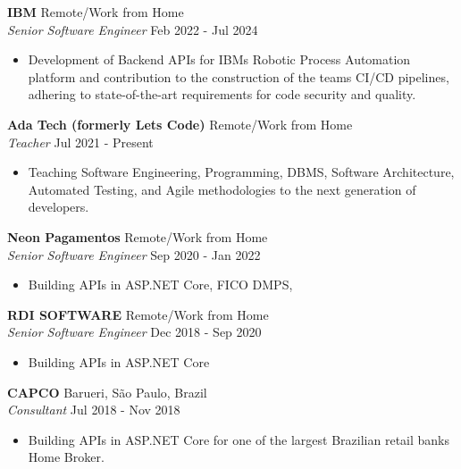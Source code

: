 \documentclass[a4paper]{article}
\begin{document}
\textbf{IBM} \hfill Remote/Work from Home\\
\textit{Senior Software Engineer} \hfill Feb 2022 - Jul 2024\\
\vspace{-1mm}
\begin{itemize} \itemsep 1pt
	\item Development of Backend APIs for IBM\textquotesingle{}s Robotic Process Automation platform and contribution to the construction of the team\textquotesingle{}s CI/CD pipelines, adhering to state-of-the-art requirements for code security and quality.
\end{itemize}
\textbf{Ada Tech (formerly Let\textquotesingle{}s Code)} \hfill Remote/Work from Home\\
\textit{Teacher} \hfill Jul 2021 - Present\\
\vspace{-1mm}
\begin{itemize} \itemsep 1pt
	\item Teaching Software Engineering, Programming, DBMS, Software Architecture, Automated Testing, and Agile methodologies to the next generation of developers.
\end{itemize}
\textbf{Neon Pagamentos} \hfill Remote/Work from Home\\
\textit{Senior Software Engineer} \hfill Sep 2020 - Jan 2022\\
\vspace{-1mm}
\begin{itemize} \itemsep 1pt
	\item Building APIs in ASP.NET Core, FICO DMPS,
\end{itemize}
\textbf{RDI SOFTWARE} \hfill Remote/Work from Home\\
\textit{Senior Software Engineer} \hfill Dec 2018 - Sep 2020\\
\vspace{-1mm}
\begin{itemize} \itemsep 1pt
	\item Building APIs in ASP.NET Core
\end{itemize}
\textbf{CAPCO} \hfill Barueri, São Paulo, Brazil\\
\textit{Consultant} \hfill Jul 2018 - Nov 2018\\
\vspace{-1mm}
\begin{itemize} \itemsep 1pt
	\item Building APIs in ASP.NET Core for one of the largest Brazilian retail banks\textquotesingle{} Home Broker.
\end{itemize}
\end{document}
